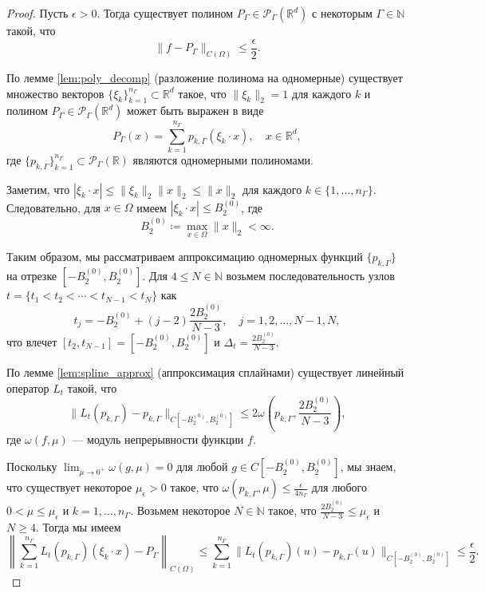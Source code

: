 \documentclass[../NDCNNAI_main.tex]{subfiles}
\begin{document}
\begin{proof}
    Пусть $\epsilon > 0$. Тогда существует полином $P_\Gamma \in \mathcal{P}_\Gamma(\mathbb{R}^d)$ с некоторым $\Gamma \in \mathbb{N}$ такой, что
    \[
    \|f - P_\Gamma\|_{C(\Omega)} \leq \frac{\epsilon}{2}.
    \]

    По лемме \ref{lem:poly_decomp} (разложение полинома на одномерные) существует множество векторов $\{\xi_k\}_{k=1}^{n_\Gamma} \subset \mathbb{R}^d$ такое, что $\|\xi_k\|_2 = 1$ для каждого $k$ и полином $P_\Gamma \in \mathcal{P}_\Gamma(\mathbb{R}^d)$ может быть выражен в виде
    \[
    P_\Gamma(x) = \sum_{k=1}^{n_\Gamma} p_{k,\Gamma}(\xi_k \cdot x), \quad x \in \mathbb{R}^d,
    \]
    где $\{p_{k,\Gamma}\}_{k=1}^{n_\Gamma} \subset \mathcal{P}_\Gamma(\mathbb{R})$ являются одномерными полиномами.

    Заметим, что $|\xi_k \cdot x| \leq \|\xi_k\|_2 \|x\|_2 \leq \|x\|_2$ для каждого $k \in \{1, \ldots, n_\Gamma\}$. Следовательно, для $x \in \Omega$ имеем $|\xi_k \cdot x| \leq B_2^{(0)}$, где
    \[
    B_2^{(0)} \coloneq \max_{x \in \Omega} \|x\|_2 < \infty.
    \]

    Таким образом, мы рассматриваем аппроксимацию одномерных функций $\{p_{k,\Gamma}\}$ на отрезке $[-B_2^{(0)}, B_2^{(0)}]$. Для $4 \leq N \in \mathbb{N}$ возьмем последовательность узлов $t = \{t_1 < t_2 < \cdots < t_{N-1} < t_N\}$ как
    \[
    t_j = -B_2^{(0)} + (j - 2)\frac{2B_2^{(0)}}{N - 3}, \quad j = 1, 2, \ldots, N-1, N,
    \]
    что влечет $[t_2, t_{N-1}] = [-B_2^{(0)}, B_2^{(0)}]$ и $\Delta_t = \frac{2B_2^{(0)}}{N - 3}$.

    По лемме \ref{lem:spline_approx} (аппроксимация сплайнами) существует линейный оператор $L_t$ такой, что
    \[
    \|L_t(p_{k,\Gamma}) - p_{k,\Gamma}\|_{C[-B_2^{(0)}, B_2^{(0)}]} \leq 2\omega\left( p_{k,\Gamma}, \frac{2B_2^{(0)}}{N - 3} \right),
    \]
    где $\omega(f, \mu)$ --- модуль непрерывности функции $f$.

    Поскольку $\lim_{\mu \to 0^+} \omega(g, \mu) = 0$ для любой $g \in C[-B_2^{(0)}, B_2^{(0)}]$, мы знаем, что существует некоторое $\mu_\epsilon > 0$ такое, что $\omega(p_{k,\Gamma}, \mu) \leq \frac{\epsilon}{4n_\Gamma}$ для любого $0 < \mu \leq \mu_\epsilon$ и $k = 1, \ldots, n_\Gamma$. Возьмем некоторое $N \in \mathbb{N}$ такое, что $\frac{2B_2^{(0)}}{N - 3} \leq \mu_\epsilon$ и $N \geq 4$. Тогда мы имеем
    \[
    \left\| \sum_{k=1}^{n_\Gamma} L_t(p_{k,\Gamma})(\xi_k \cdot x) - P_\Gamma \right\|_{C(\Omega)} \leq \sum_{k=1}^{n_\Gamma} \|L_t(p_{k,\Gamma})(u) - p_{k,\Gamma}(u)\|_{C[-B_2^{(0)}, B_2^{(0)}]} \leq \frac{\epsilon}{2}.
    \]


\end{proof}
\end{document}
